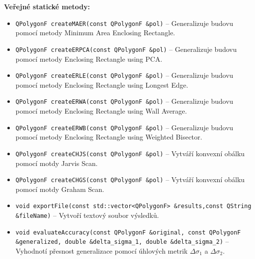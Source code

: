 \textbf{Veřejné statické metody:}
\begin{itemize}
\item \texttt{QPolygonF createMAER(const QPolygonF \&pol)} – Generalizuje budovu pomocí metody Minimum Area Enclosing Rectangle.
\item \texttt{QPolygonF createERPCA(const QPolygonF \&pol)} – Generalizuje budovu pomocí metody Enclosing Rectangle using PCA.
\item \texttt{QPolygonF createERLE(const QPolygonF \&pol)} – Generalizuje budovu pomocí metody Enclosing Rectangle using Longest Edge.
\item \texttt{QPolygonF createERWA(const QPolygonF \&pol)} – Generalizuje budovu pomocí metody Enclosing Rectangle using Wall Average.
\item \texttt{QPolygonF createERWB(const QPolygonF \&pol)} – Generalizuje budovu pomocí metody Enclosing Rectangle using Weighted Bisector.
\item \texttt{QPolygonF createCHJS(const QPolygonF \&pol)} – Vytváří konvexní obálku pomocí motdy Jarvis Scan.
\item \texttt{QPolygonF createCHGS(const QPolygonF \&pol)} – Vytváří konvexní obálku pomocí motdy Graham Scan.
\item \texttt{void exportFile(const std::vector<QPolygonF> \&results,const QString \&fileName)} – Vytvoří textový soubor výsledků.
\item \texttt{void evaluateAccuracy(const QPolygonF \&original, const QPolygonF \&generalized, double \&delta\_sigma\_1, double \&delta\_sigma\_2)} – Vyhodnotí přesnost generalizace pomocí úhlových metrik $\Delta \sigma_1$ a $\Delta \sigma_2$.
\end{itemize}


